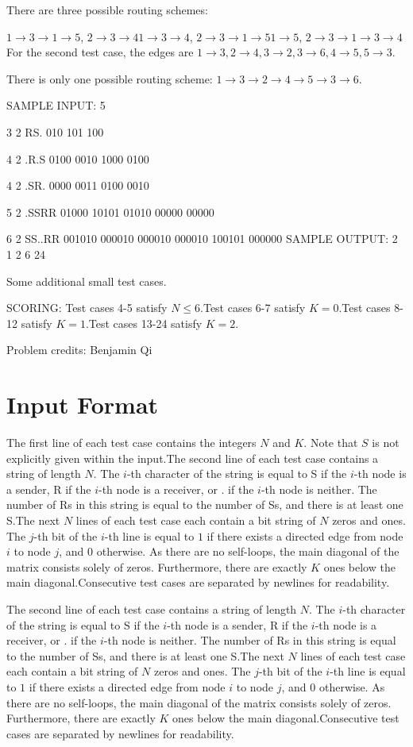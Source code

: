 \documentclass[12pt]{article}
\begin{document}
There are three possible routing schemes:

$1\to 3\to 1\to 5$, $2\to 3\to 4$$1\to 3\to 4$,
$2\to 3\to 1\to 5$$1\to 5$, $2\to 3\to 1\to 3\to 4$
For the second test case, the edges are
$1\to 3, 2\to 4, 3\to 2,3\to 6, 4\to 5, 5\to 3$.

There is only one possible routing scheme:
$1\to 3\to 2\to 4\to 5\to 3\to 6$.

SAMPLE INPUT:
5

3 2
RS.
010
101
100

4 2
.R.S
0100
0010
1000
0100

4 2
.SR.
0000
0011
0100
0010

5 2
.SSRR
01000
10101
01010
00000
00000

6 2
SS..RR
001010
000010
000010
000010
100101
000000
SAMPLE OUTPUT: 
2
1
2
6
24

Some additional small test cases.

SCORING:
Test cases 4-5 satisfy $N\le 6$.Test cases 6-7 satisfy $K=0$.Test cases 8-12 satisfy $K=1$.Test cases 13-24 satisfy $K=2$.


Problem credits: Benjamin Qi



\section*{Input Format}
The first line of each test case contains the integers $N$ and $K$. Note that
$S$  is not explicitly given within the input.The second line of each test case contains a string of length $N$. The $i$-th
character of the string  is equal to S if the $i$-th node is a sender, R if the
$i$-th node is a receiver, or . if the $i$-th node is neither. The number of Rs
in this string is equal to the number of Ss, and there is at least one S.The next $N$ lines of each test case each contain a bit string of $N$ zeros and
ones. The $j$-th bit of the $i$-th line is equal to $1$ if there exists a
directed edge from node $i$  to node $j$, and $0$ otherwise. As there are no
self-loops, the main diagonal of the matrix consists solely of zeros.
Furthermore, there are exactly $K$ ones below the main diagonal.Consecutive test cases are separated by newlines for readability.

The second line of each test case contains a string of length $N$. The $i$-th
character of the string  is equal to S if the $i$-th node is a sender, R if the
$i$-th node is a receiver, or . if the $i$-th node is neither. The number of Rs
in this string is equal to the number of Ss, and there is at least one S.The next $N$ lines of each test case each contain a bit string of $N$ zeros and
ones. The $j$-th bit of the $i$-th line is equal to $1$ if there exists a
directed edge from node $i$  to node $j$, and $0$ otherwise. As there are no
self-loops, the main diagonal of the matrix consists solely of zeros.
Furthermore, there are exactly $K$ ones below the main diagonal.Consecutive test cases are separated by newlines for readability.
\end{document}
